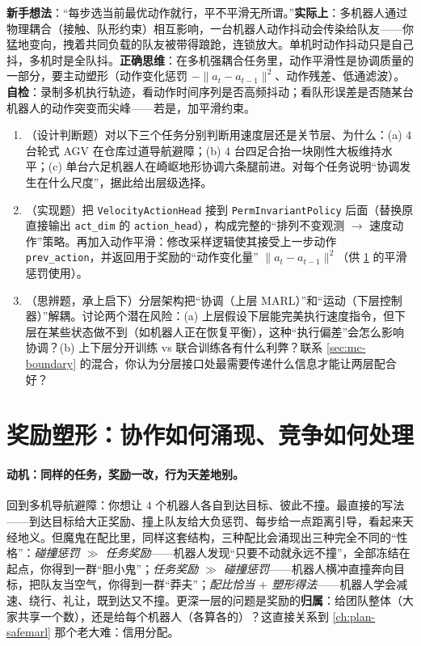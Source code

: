 \begin{pitfall}
\textbf{新手想法}：“每步选当前最优动作就行，平不平滑无所谓。”\textbf{实际上}：多机器人通过物理耦合（接触、队形约束）相互影响，一台机器人动作抖动会传染给队友——你猛地变向，拽着共同负载的队友被带得踉跄，连锁放大。单机时动作抖动只是自己抖，多机时是全队抖。\textbf{正确思维}：在多机强耦合任务里，动作平滑性是协调质量的一部分，要主动塑形（动作变化惩罚 $-\|a_t-a_{t-1}\|^2$、动作残差、低通滤波）。\textbf{自检}：录制多机执行轨迹，看动作时间序列是否高频抖动；看队形误差是否随某台机器人的动作突变而尖峰——若是，加平滑约束。
\end{pitfall}

\begin{practice}
\begin{enumerate}
  \item （设计判断题）对以下三个任务分别判断用速度层还是关节层、为什么：(a) $4$ 台轮式 AGV 在仓库过道导航避障；(b) $4$ 台四足合抬一块刚性大板维持水平；(c) 单台六足机器人在崎岖地形协调六条腿前进。对每个任务说明“协调发生在什么尺度”，据此给出层级选择。
  \item （实现题）把 \verb|VelocityActionHead| 接到 \verb|PermInvariantPolicy| 后面（替换原直接输出 \verb|act_dim| 的 \verb|action_head|），构成完整的“排列不变观测 $\to$ 速度动作”策略。再加入动作平滑：修改采样逻辑使其接受上一步动作 \verb|prev_action|，并返回用于奖励的“动作变化量” $\|a_t-a_{t-1}\|^2$（供 \cref{sec:mc-reward} 的平滑惩罚使用）。
  \item （思辨题，承上启下）分层架构把“协调（上层 MARL）”和“运动（下层控制器）”解耦。讨论两个潜在风险：(a) 上层假设下层能完美执行速度指令，但下层在某些状态做不到（如机器人正在恢复平衡），这种“执行偏差”会怎么影响协调？(b) 上下层分开训练 vs 联合训练各有什么利弊？联系 \cref{sec:mc-boundary} 的混合，你认为分层接口处最需要传递什么信息才能让两层配合好？
\end{enumerate}
\end{practice}

\section{奖励塑形：协作如何涌现、竞争如何处理}
\label{sec:mc-reward}

\paragraph{动机：同样的任务，奖励一改，行为天差地别。}
回到多机导航避障：你想让 $4$ 个机器人各自到达目标、彼此不撞。最直接的写法——到达目标给大正奖励、撞上队友给大负惩罚、每步给一点距离引导，看起来天经地义。但魔鬼在配比里，同样这套结构，三种配比会涌现出三种完全不同的“性格”：\emph{碰撞惩罚 $\gg$ 任务奖励}——机器人发现“只要不动就永远不撞”，全部冻结在起点，你得到一群“胆小鬼”；\emph{任务奖励 $\gg$ 碰撞惩罚}——机器人横冲直撞奔向目标，把队友当空气，你得到一群“莽夫”；\emph{配比恰当 $+$ 塑形得法}——机器人学会减速、绕行、礼让，既到达又不撞。更深一层的问题是奖励的\textbf{归属}：给团队整体（大家共享一个数），还是给每个机器人（各算各的）？这直接关系到 \cref{ch:plan-safemarl} 那个老大难：信用分配。

